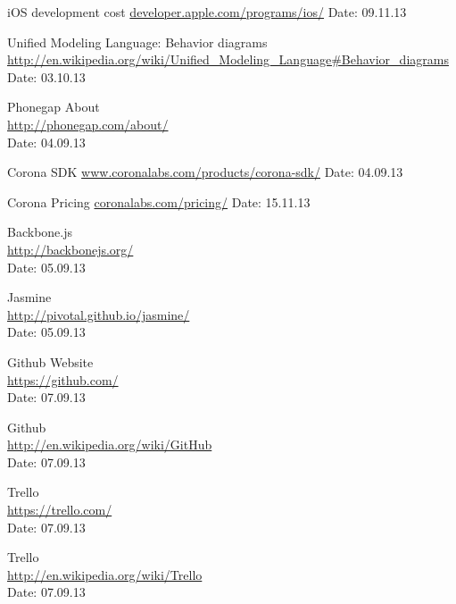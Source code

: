 \begin{thebibliography}{99}
	iOS development cost\newline
	\href {https://developer.apple.com/programs/ios/}{developer.apple.com/programs/ios/}\newline
	Date: 09.11.13

	Unified Modeling Language: Behavior diagrams
	\href {http://en.wikipedia.org/wiki/Unified_Modeling_Language#Behavior_diagrams }{http://en.wikipedia.org/wiki/Unified\_Modeling\_Language\#Behavior\_diagrams}
	Date: 03.10.13

	Phonegap About \\
	\href{http://phonegap.com/about/}{http://phonegap.com/about/} \\
	Date: 04.09.13

	Corona SDK\newline
	\href {http://www.coronalabs.com/products/corona-sdk/}{www.coronalabs.com/products/corona-sdk/}\newline
	Date: 04.09.13

	Corona Pricing\newline
	\href {http://coronalabs.com/pricing/}{coronalabs.com/pricing/}\newline
	Date: 15.11.13

	Backbone.js \\
	\href{http://backbonejs.org/}{http://backbonejs.org/} \\
	Date: 05.09.13

	Jasmine \\ 
	\href{http://pivotal.github.io/jasmine/}{http://pivotal.github.io/jasmine/} \\
	Date: 05.09.13

	Github Website\\
	\href{https://github.com/}{https://github.com/} \\
	Date: 07.09.13

	Github \\
	\href{http://en.wikipedia.org/wiki/GitHub}{http://en.wikipedia.org/wiki/GitHub} \\
	Date: 07.09.13

	Trello \\
	\href{https://trello.com/}{https://trello.com/} \\
	Date: 07.09.13

	Trello \\
	\href{http://en.wikipedia.org/wiki/Trello}{http://en.wikipedia.org/wiki/Trello} \\
	Date: 07.09.13


\end{thebibliography}
